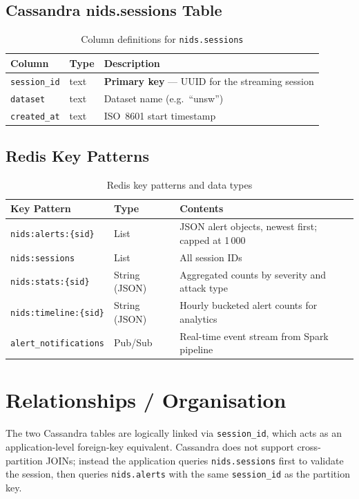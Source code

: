 \documentclass[12pt,a4paper]{report}
\begin{document}
\subsection{Cassandra nids.sessions Table}
\begin{table}[H]
  \centering
  \caption{Column definitions for \texttt{nids.sessions}}
  \label{tab:sessions-cols}
  \begin{tabular}{llp{7cm}}
    \toprule
    \textbf{Column}   & \textbf{Type} & \textbf{Description} \\
    \midrule
    \texttt{session\_id}  & text & \textbf{Primary key} --- UUID for the
      streaming session \\
    \texttt{dataset}      & text & Dataset name (e.g.\ ``unsw'') \\
    \texttt{created\_at}  & text & ISO~8601 start timestamp \\
    \bottomrule
  \end{tabular}
\end{table}

\subsection{Redis Key Patterns}
\begin{table}[H]
  \centering
  \caption{Redis key patterns and data types}
  \label{tab:redis-keys}
  \begin{tabularx}{\textwidth}{llX}
    \toprule
    \textbf{Key Pattern}                  & \textbf{Type} & \textbf{Contents} \\
    \midrule
    \texttt{nids:alerts:\{sid\}}         & List & JSON alert objects, newest
      first; capped at 1\,000 \\
    \texttt{nids:sessions}               & List & All session IDs \\
    \texttt{nids:stats:\{sid\}}          & String (JSON) & Aggregated counts
      by severity and attack type \\
    \texttt{nids:timeline:\{sid\}}       & String (JSON) & Hourly bucketed
      alert counts for analytics \\
    \texttt{alert\_notifications}        & Pub/Sub & Real-time event stream
      from Spark pipeline \\
    \bottomrule
  \end{tabularx}
\end{table}

\section{Relationships / Organisation}
The two Cassandra tables are logically linked via \texttt{session\_id},
which acts as an application-level foreign-key equivalent.  Cassandra does not
support cross-partition JOINs; instead the application queries
\texttt{nids.sessions} first to validate the session, then queries
\texttt{nids.alerts} with the same \texttt{session\_id} as the partition key.
\end{document}
